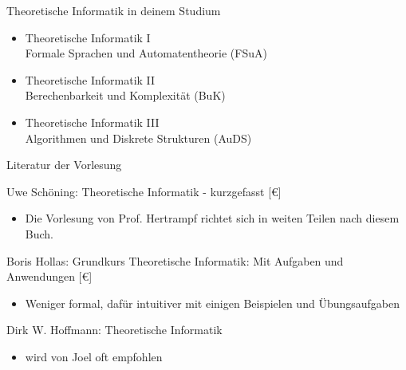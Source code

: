 \begin{frame}{Theoretische Informatik in deinem Studium}
    \begin{itemize}
        \item Theoretische Informatik I\\
        Formale Sprachen und Automatentheorie (FSuA)
        \item Theoretische Informatik II\\
        Berechenbarkeit und Komplexität (BuK)
        \item Theoretische Informatik III\\
        Algorithmen und Diskrete Strukturen (AuDS)
    \end{itemize}
\end{frame}

\begin{frame}{Literatur der Vorlesung}
    \small{Uwe Schöning: Theoretische Informatik - kurzgefasst [€]\\
    \begin{itemize}
        \item Die Vorlesung von Prof. Hertrampf richtet sich in weiten Teilen nach diesem Buch.
    \end{itemize}
    Boris Hollas: Grundkurs Theoretische Informatik: Mit Aufgaben und Anwendungen [€]\\
    \begin{itemize}
        \item Weniger formal, dafür intuitiver mit einigen Beispielen und Übungsaufgaben
    \end{itemize}
    Dirk W. Hoffmann: Theoretische Informatik
    \begin{itemize}
        \item wird von Joel oft empfohlen
    \end{itemize}}
    
\end{frame}
